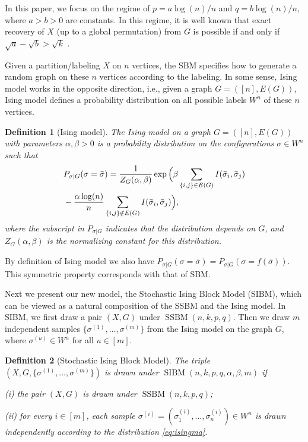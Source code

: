 \documentclass[conference]{IEEEtran}
\newtheorem{definition}{Definition}%
\DeclareMathOperator{\SSBM}{SSBM}
\DeclareMathOperator{\SIBM}{SIBM}
\begin{document}
In this paper, we focus on the regime of $p=a\log(n)/n$ and $q=b\log(n)/n$, where $a>b> 0$ are constants. In this regime, it is well known that exact recovery of $X$ (up to a global permutation) from $G$ is possible if and only if $\sqrt{a}-\sqrt{b} > \sqrt{k}$  \cite{abbe2015exact}.
 
Given a partition/labeling $X$ on $n$ vertices, the SBM specifies how to generate a random graph on these $n$ vertices according to the labeling. In some sense, Ising model works in the opposite direction, i.e., given a graph $G=([n],E(G))$, Ising model defines a probability distribution on all possible labels $W^n$ of these $n$ vertices. 

 
\begin{definition}[Ising model]
The Ising model on a graph $G=([n],E(G))$ with parameters $\alpha,\beta>0$ is a probability distribution on the configurations $\sigma\in W^n$ such that
\begin{align} \label{eq:isingma}
&P_{\sigma|G}(\sigma=\bar{\sigma})=\frac{1}{Z_G(\alpha,\beta)}
\exp\Big(\beta\sum_{\{i,j\}\in E(G)} I(\bar{\sigma}_i ,\bar{\sigma}_j)\notag\\
&-\frac{\alpha\log(n)}{n} \sum_{\{i,j\}\notin E(G)} I(\bar{\sigma}_i, \bar{\sigma}_j)\Big) ,
\end{align}
where the subscript in $P_{\sigma|G}$ indicates that the distribution depends on $G$, and
$Z_G(\alpha,\beta)$ is the normalizing constant for this distribution.
\end{definition}

By definition of Ising model we also have $P_{\sigma|G}(\sigma=\bar{\sigma})=P_{\sigma|G}(\sigma=f(\bar{\sigma}))$. This symmetric property corresponds with that of SBM.

Next we present our new model, the Stochastic Ising Block Model (SIBM), which can be viewed as a natural composition of the SSBM and the Ising model. In SIBM, we first draw a pair $(X,G)$ under $\SSBM(n,k,p,q)$.  Then we draw $m$ independent samples $\{\sigma^{(1)},\dots,\sigma^{(m)}\}$ from the Ising model on the graph $G$, where $\sigma^{(u)}\in W^n$ for all $u\in[m]$.

\begin{definition}[Stochastic Ising Block Model]
The triple $(X,G,\{\sigma^{(1)},\dots,\sigma^{(m)}\})$ is drawn under $\SIBM(n,k, p,q,\alpha,\beta,m)$ if

\noindent
(i) the pair $(X,G)$ is drawn under $\SSBM(n,k, p,q)$;

\noindent
(ii) for every $i\in[m]$, each sample $\sigma^{(i)}=(\sigma_1^{(i)},\dots,\sigma_n^{(i)}) \in W^n$ is drawn independently according to the distribution \eqref{eq:isingma}.
\end{definition}
\end{document}
